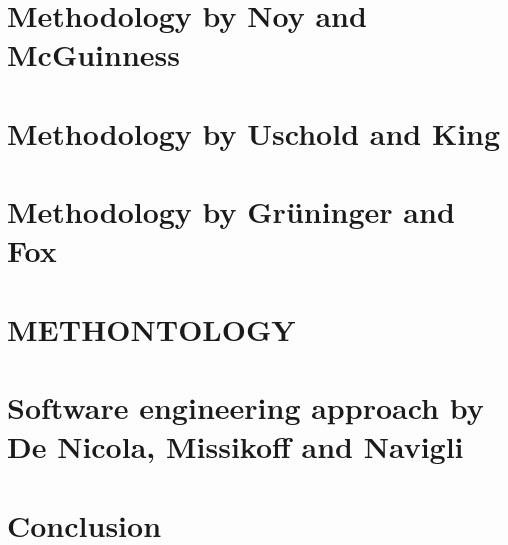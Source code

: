 
\section{Methodology by Noy and McGuinness}

\section{Methodology by Uschold and King}

\section{Methodology by Grüninger and Fox}

\section{METHONTOLOGY}

\section{Software engineering approach by De Nicola, Missikoff and Navigli}

\section{Conclusion}

